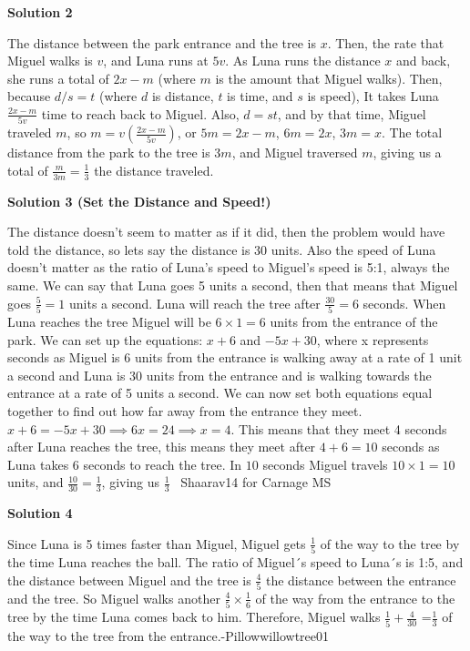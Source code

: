 \begin{enumerate}
 



\textbf{Solution 2}

The distance between the park entrance and the tree is $x$. Then, the rate that Miguel walks is $v$, and Luna runs at $5v$. As Luna runs the distance $x$ and back, she runs a total of $2x - m$ (where $m$ is the amount that Miguel walks). Then, because $d/s = t$ (where $d$ is distance, $t$ is time, and $s$ is speed), It takes Luna $\frac{2x - m}{5v}$ time to reach back to Miguel. Also, $d = st$, and by that time, Miguel traveled $m$, so $m = v\left(\frac{2x - m}{5v}\right)$, or $5m = 2x - m$, $6m = 2x$, $3m = x$. The total distance from the park to the tree is $3m$, and Miguel traversed $m$, giving us a total of $\frac{m}{3m} = \boxed{\frac{1}{3}}$ the distance traveled.

 



\textbf{Solution 3 (Set the Distance and Speed!)}

The distance doesn't seem to matter as if it did, then the problem would have told the distance, so lets say the distance is 30 units. Also the speed of Luna doesn't matter as the ratio of Luna's speed to Miguel's speed is 5:1, always the same. We can say that Luna goes 5 units a second, then that means that Miguel goes $\frac{5}{5} =1$ units a second. Luna will reach the tree after $\frac{30}{5} =6$ seconds. When Luna reaches the tree Miguel will be $6 \times 1 = 6$ units from the entrance of the park. We can set up the equations: $x+6$ and $-5x+30$, where x represents seconds as Miguel is 6 units from the entrance is walking away at a rate of 1 unit a second and Luna is 30 units from the entrance and is walking towards the entrance at a rate of 5 units a second. We can now set both equations equal together to find out how far away from the entrance they meet. $x+6=-5x+30 \implies 6x=24 \implies x=4$. This means that they meet 4 seconds after Luna reaches the tree, this means they meet after $4+6=10$ seconds as Luna takes 6 seconds to reach the tree. In $10$ seconds Miguel travels $10 \times 1=10$ units, and $\frac{10}{30} = \frac{1}{3}$, giving us $\boxed{\frac{1}{3}}$~ Shaarav14 for Carnage MS

 



\textbf{Solution 4}

Since Luna is 5 times faster than Miguel, Miguel gets $\frac{1}{5}$  of the way to the tree by the time Luna reaches the ball. The ratio of Miguel´s speed to Luna´s is 1:5, and the distance between Miguel and the tree is $\frac{4}{5}$ the distance between the entrance and the tree. So Miguel walks another $\frac{4}{5} \times \frac{1}{6}$ of the way from the entrance to the tree by the time Luna comes back to him. Therefore, Miguel walks $\frac{1}{5} + \frac{4}{30}$ =$\boxed{\frac{1}{3}}$ of the way to the tree from the entrance.-Pillowwillowtree01


\end{enumerate}
